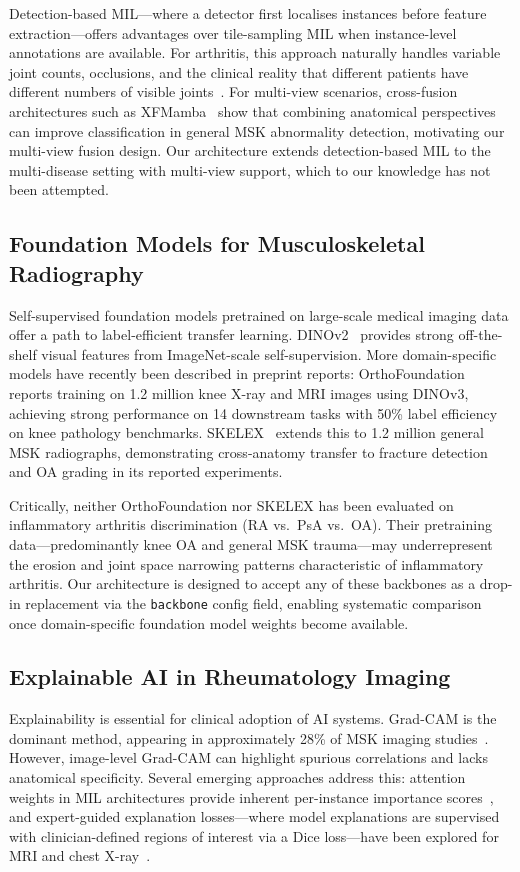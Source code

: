 \documentclass{article}
\begin{document}
Detection-based MIL---where a detector first localises instances before feature extraction---offers advantages over tile-sampling MIL when instance-level annotations are available. For arthritis, this approach naturally handles variable joint counts, occlusions, and the clinical reality that different patients have different numbers of visible joints~\cite{scirep2025}. For multi-view scenarios, cross-fusion architectures such as XFMamba~\cite{carion2025} show that combining anatomical perspectives can improve classification in general MSK abnormality detection, motivating our multi-view fusion design. Our architecture extends detection-based MIL to the multi-disease setting with multi-view support, which to our knowledge has not been attempted.

\subsection{Foundation Models for Musculoskeletal Radiography}
Self-supervised foundation models pretrained on large-scale medical imaging data offer a path to label-efficient transfer learning. DINOv2~\cite{dinov22023} provides strong off-the-shelf visual features from ImageNet-scale self-supervision. More domain-specific models have recently been described in preprint reports: OrthoFoundation~\cite{orthofoundation2026} reports training on 1.2 million knee X-ray and MRI images using DINOv3, achieving strong performance on 14 downstream tasks with 50\% label efficiency on knee pathology benchmarks. SKELEX~\cite{skelex2026} extends this to 1.2 million general MSK radiographs, demonstrating cross-anatomy transfer to fracture detection and OA grading in its reported experiments.

Critically, neither OrthoFoundation nor SKELEX has been evaluated on inflammatory arthritis discrimination (RA vs.\ PsA vs.\ OA). Their pretraining data---predominantly knee OA and general MSK trauma---may underrepresent the erosion and joint space narrowing patterns characteristic of inflammatory arthritis. Our architecture is designed to accept any of these backbones as a drop-in replacement via the \texttt{backbone} config field, enabling systematic comparison once domain-specific foundation model weights become available.

\subsection{Explainable AI in Rheumatology Imaging}
Explainability is essential for clinical adoption of AI systems. Grad-CAM is the dominant method, appearing in approximately 28\% of MSK imaging studies~\cite{semin_arthritis2025}. However, image-level Grad-CAM can highlight spurious correlations and lacks anatomical specificity. Several emerging approaches address this: attention weights in MIL architectures provide inherent per-instance importance scores~\cite{bo2025}, and expert-guided explanation losses---where model explanations are supervised with clinician-defined regions of interest via a Dice loss---have been explored for MRI and chest X-ray~\cite{uddin2025}.
\end{document}
